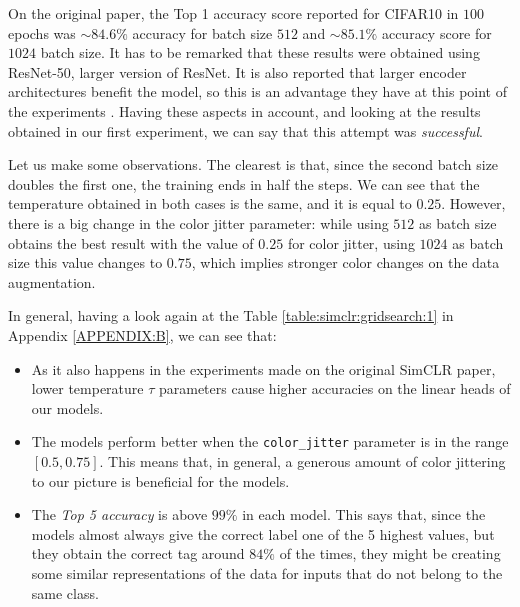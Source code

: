 \begin{table}[H]
    \label{table:best:first:simclr}
\centering
{}
\caption{Best results for the grid search experiment with SimCLR.}
\end{table}

\begin{remark}
On the original paper, the Top 1 accuracy score reported for CIFAR10 in $100$ epochs was $\sim 84.6\%$ accuracy for batch size $512$ and $\sim 85.1 \%$ accuracy score for $1024$ batch size. It has to be remarked that these results were obtained using ResNet-50,  larger version of ResNet. It is also reported that larger encoder architectures benefit the model, so this is an advantage they have at this point of the experiments . Having these aspects in account, and looking at the results obtained in our first experiment, we can say that this attempt was \emph{successful}.
\end{remark}

Let us make some observations. The clearest is that, since the second batch size doubles the first one, the training ends in half the steps. We can see that the temperature obtained in both cases is the same, and it is equal to $0.25$. However, there is a big change in the color jitter parameter: while using $512$ as batch size obtains the best result with the value of $0.25$ for color jitter, using $1024$ as batch size this value changes to $0.75$, which implies stronger color changes on the data augmentation. 

In general, having a look again at the Table \ref{table:simclr:gridsearch:1} in Appendix \ref{APPENDIX:B},  we can see that:

\begin{itemize}
    \item As it also happens in the experiments made on the original SimCLR paper, lower temperature $\tau$ parameters cause higher accuracies on the linear heads of our models.
    
    \item The models perform better when the \lstinline{color_jitter} parameter is in the range $[0.5,0.75]$. This means that, in general, a generous amount of color jittering to our picture is beneficial for the models.

    \item The \emph{Top 5 accuracy} is above $99\%$ in each model. This says that, since the models almost always give the correct label one of the 5 highest values, but they obtain the correct tag around $84\%$ of the times, they might be creating some similar representations of the data for inputs that do not belong to the same class. 
\end{itemize}

